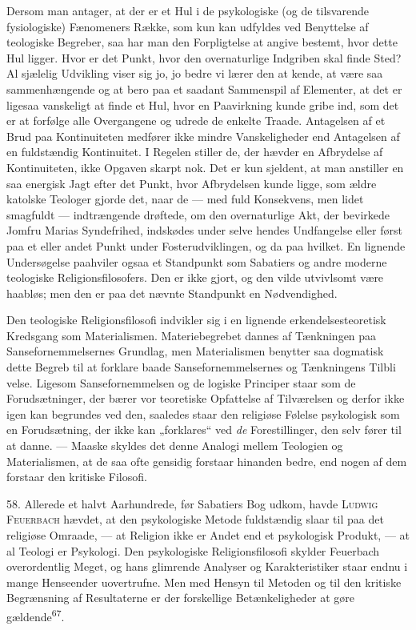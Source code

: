 \documentclass[12pt,a4paper,openany]{book}
\newcommand{\opage}[1]{\marginnote{\footnotesize\textit{[#1]}}}
\begin{document}
Dersom man antager, at der er et Hul i de psykologiske (og de
tilsvarende fysiologiske) Fænomeners Række, som kun kan udfyldes ved
Benyttelse af teologiske Begreber, saa har man den Forpligtelse at
angive bestemt, hvor dette Hul ligger. Hvor er det Punkt, hvor den
overnaturlige Indgriben skal finde Sted? Al sjælelig Udvikling viser sig
jo, jo bedre vi lærer den at kende, at være saa sammenhængende og at
bero paa et saadant Sammenspil af Elementer, at det er ligesaa
vanskeligt at finde et Hul, hvor en Paavirkning kunde gribe ind, som det
er at forfølge alle Overgangene og udrede de enkelte Traade. Antagelsen
af et Brud paa Kontinuiteten medfører ikke mindre Vanskeligheder end
Antagelsen af en fuldstændig Kontinuitet. I Regelen stiller de, der
hævder en Afbrydelse af Kontinuiteten, ikke Opgaven skarpt nok. Det er
kun sjeldent, at man anstiller en saa energisk Jagt efter det Punkt,
hvor Afbrydelsen kunde ligge, som ældre katolske Teologer gjorde det,
naar de --- med fuld Konsekvens, men lidet smagfuldt --- indtrængende
drøftede, om den overnaturlige Akt, der bevirkede Jomfru Marias
Syndefrihed, indskødes under selve hendes Undfangelse eller først paa et
eller andet Punkt under Fosterudviklingen, og da paa hvilket. En
lignende Undersøgelse paahviler ogsaa et Standpunkt som Sabatiers og
andre moderne teologiske Religionsfilosofers. Den er ikke gjort, og den
vilde utvivlsomt være haabløs; men den er paa det nævnte Standpunkt en
Nødvendighed.

Den teologiske Religionsfilosofi indvikler sig i en lignende
erkendelsesteoretisk Kredsgang som Materialismen. Materiebegrebet dannes
af Tænkningen paa Sansefornemmelsernes Grundlag, men Materialismen
benytter saa dogmatisk dette Begreb til at forklare baade
Sansefornemmelsernes og Tænkningens Tilbli%
\opage{129}velse. Ligesom Sansefornemmelsen og de logiske Principer
staar som de Forudsætninger, der bærer vor teoretiske Opfattelse af
Tilværelsen og derfor ikke igen kan begrundes ved den, saaledes staar
den religiøse Følelse psykologisk som en Forudsætning, der ikke kan
„forklares“ ved \textit{de} Forestillinger, den selv fører til at danne.
--- Maaske skyldes det denne Analogi mellem Teologien og Materialismen,
at de saa ofte gensidig forstaar hinanden bedre, end nogen af dem
forstaar den kritiske Filosofi.

58. Allerede et halvt Aarhundrede, før Sabatiers Bog udkom, havde
\textsc{Ludwig Feuerbach} hævdet, at den psykologiske Metode fuldstændig
slaar til paa det religiøse Omraade, --- at Religion ikke er Andet end
et psykologisk Produkt, --- at al Teologi er Psykologi. Den psykologiske
Religionsfilosofi skylder Feuerbach overordentlig Meget, og hans
glimrende Analyser og Karakteristiker staar endnu i mange Henseender
uovertrufne. Men med Hensyn til Metoden og til den kritiske Begrænsning
af Resultaterne er der forskellige Betænkeligheder at gøre
gældende\textsuperscript{67}.
\end{document}

